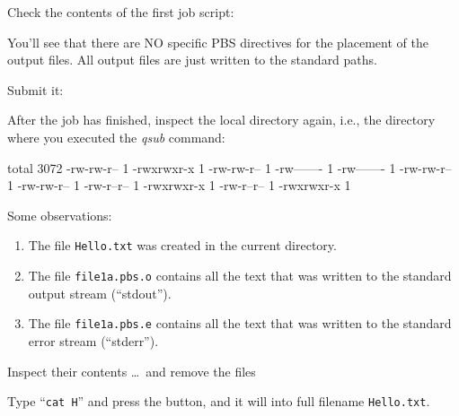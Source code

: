 Check the contents of the first job script:


You'll see that there are NO specific PBS directives for the placement of the output files. All output files are
just written to the standard paths.

Submit it:

\begin{prompt}
\end{prompt}

After the job has finished, inspect the local directory again, i.e., the
directory where you executed the \emph{qsub} command:

\begin{prompt}
total 3072
-rw-rw-r-- 1 %
-rwxrwxr-x 1 %
-rw-rw-r-- 1 %
-rw------- 1 %
-rw------- 1 %
-rw-rw-r-- 1 %
-rw-rw-r-- 1 %
-rw-r--r-- 1 %
-rwxrwxr-x 1 %
-rw-r--r-- 1 %
-rwxrwxr-x 1 %
\end{prompt}

Some observations:
\begin{enumerate}
\item The file \texttt{Hello.txt} was created in the current directory.
\item The file \texttt{file1a.pbs.o\jobnumber} contains all the text that was written to the standard output stream (``stdout'').
\item The file \texttt{file1a.pbs.e\jobnumber} contains all the text that was written to the standard error stream (``stderr'').
\end{enumerate}

Inspect their contents \dots\ and remove the files

\begin{prompt}
\end{prompt}

\begin{tip}
Type ``\texttt{cat H}'' and press the  button, and it will
 into full filename \texttt{Hello.txt}.
\end{tip}

